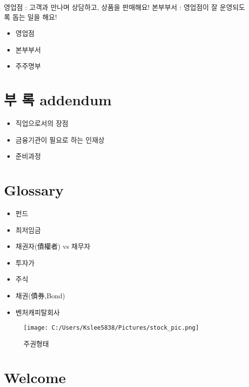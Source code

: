\documentclass[
]{book}
\providecommand{\tightlist}{%
  \setlength{\itemsep}{0pt}\setlength{\parskip}{0pt}}
\begin{document}
영업점 : 고객과 만나며 상담하고, 상품을 판매해요!
본부부서 : 영업점이 잘 운영되도록 돕는 일을 해요!

\begin{itemize}
\item
  영업점
\item
  본부부서
\item
  주주명부
\end{itemize}

\hypertarget{uxbd80-uxb85d-addendum}{%
\section{부 록 addendum}\label{uxbd80-uxb85d-addendum}}

\begin{itemize}
\tightlist
\item
  직업으로서의 장점\\
\item
  금융기관이 필요로 하는 인재상\\
\item
  준비과정
\end{itemize}

\hypertarget{glossary}{%
\section{Glossary}\label{glossary}}

\begin{itemize}
\tightlist
\item
  펀드\\
\item
  최저임금\\
\item
  채권자(債權者) vs 채무자\\
\item
  투자가\\
\item
  주식\\
\item
  채권(債券,Bond)\\
\item
  벤처캐피탈회사
\end{itemize}

\begin{figure}
\centering
\texttt{[image: C:/Users/Kslee5838/Pictures/stock\_pic.png]}
\caption{주권형태}
\end{figure}

\hypertarget{welcome}{%
\section{Welcome}\label{welcome}}
\end{document}
